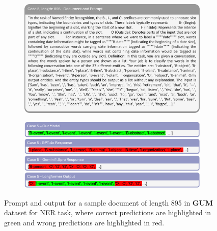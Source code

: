 \documentclass[11pt]{article}
\begin{document}
\begin{figure}[!h]
    \centering
    \begin{subfigure}[b]{1.0\linewidth}   
        \includegraphics[width=\textwidth]{images/case5_prompt.png} %
    \end{subfigure}
    \vspace{1pt}
    \begin{subfigure}[b]{1.0\linewidth}  
        \includegraphics[width=\textwidth]{images/case5_ans.png}
    \end{subfigure}
    \caption{Prompt and output for a sample document of length 895 in \textbf{GUM} dataset for NER task, where correct predictions are highlighted in green and wrong predictions are highlighted in red.}
    \label{case5}
\end{figure}
\end{document}
